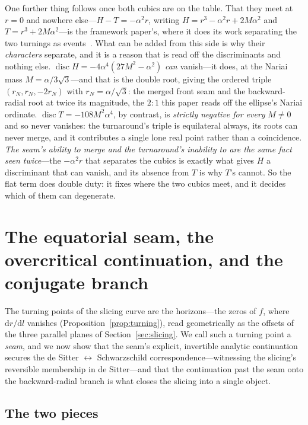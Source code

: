 \documentclass[11pt,a4paper]{article}
\theoremstyle{definition}
\begin{document}
One further thing follows once both cubics are on the table. That they meet at $r=0$ and nowhere else---$H-T=-\alpha^{2}r$, writing $H=r^{3}-\alpha^{2}r+2M\alpha^{2}$ and $T=r^{3}+2M\alpha^{2}$---is the framework paper's, where it does its work separating the two turnings as events~\cite{JanzenCRframework}. What can be added from this side is why their \emph{characters} separate, and it is a reason that is read off the discriminants and nothing else. $\operatorname{disc}H=-4\alpha^{4}(27M^{2}-\alpha^{2})$ \emph{can} vanish---it does, at the Nariai mass $M=\alpha/3\sqrt3$---and that is the double root, giving the ordered triple $(r_{N},r_{N},-2r_{N})$ with $r_{N}=\alpha/\sqrt3$: the merged front seam and the backward-radial root at twice its magnitude, the $2{:}1$ this paper reads off the ellipse's Nariai ordinate. $\operatorname{disc}T=-108M^{2}\alpha^{4}$, by contrast, is \emph{strictly negative for every} $M\neq0$ and so never vanishes: the turnaround's triple is equilateral always, its roots can never merge, and it contributes a single lone real point rather than a coincidence. \emph{The seam's ability to merge and the turnaround's inability to are the same fact seen twice}---the $-\alpha^{2}r$ that separates the cubics is exactly what gives $H$ a discriminant that can vanish, and its absence from $T$ is why $T$'s cannot. So the flat term does double duty: it fixes where the two cubics meet, and it decides which of them can degenerate.

\section{The equatorial seam, the overcritical continuation, and the conjugate branch}\label{sec:seam}

The turning points of the slicing curve are the horizons---the zeros of $f$, where $\mathrm{d}r/\mathrm{d}l$ vanishes (Proposition~\ref{prop:turning}), read geometrically as the offsets of the three parallel planes of Section~\ref{sec:slicing}. We call such a turning point a \emph{seam}, and we now show that the seam's explicit, invertible analytic continuation secures the de Sitter $\leftrightarrow$ Schwarzschild correspondence---witnessing the slicing's reversible membership in de Sitter---and that the continuation past the seam onto the backward-radial branch is what closes the slicing into a single object.

\subsection{The two pieces}
\end{document}
